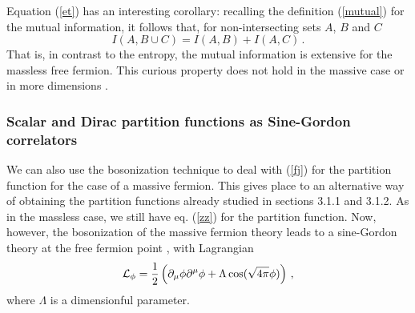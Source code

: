 \documentclass[a4paper]{article}
\begin{document}
Equation (\ref{et}) has an interesting corollary: recalling the
definition (\ref{mutual}) for the mutual information, it follows that, for
non-intersecting sets $A$, $B$ and $C$
\begin{equation}
I(A,B\cup C)=I(A,B)+I(A,C)\,.
\end{equation}
That is, in contrast to the entropy, the mutual information is extensive for the massless free fermion. This curious property
does not hold in the massive case or in more dimensions \cite{remarks}. 

\subsubsection{Scalar and Dirac partition functions as Sine-Gordon correlators}
We can also use the bosonization technique to deal with (\ref{fj}) for the
partition function for the case of a massive fermion.
This gives place to an alternative way of obtaining the partition functions already studied in sections 3.1.1 and 3.1.2.
As in the massless case, we still  
have eq. (\ref{zz}) for the partition function. Now, however, the bosonization of the massive fermion theory
leads to a sine-Gordon theory at the free fermion point \cite{sinegordon}, with Lagrangian 
\begin{equation}
{\cal L}_\phi=\frac{1}{2}\left( \partial_\mu \phi \partial ^\mu \phi+\Lambda \cos(\sqrt{4 \pi}\phi)\right)\,,\label{sg}
\end{equation}
where $\Lambda$ is a dimensionful parameter. 
 
\end{document}
